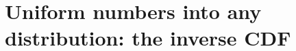 \providecommand{\SixBHoMidCen}{}\renewcommand{\SixBHoMidCen}{0.3184}
\providecommand{\SixBHoRelErrMid}{}\renewcommand{\SixBHoRelErrMid}{0.07862}
\providecommand{\SixBHoRelErrEdge}{}\renewcommand{\SixBHoRelErrEdge}{0.02982}
\providecommand{\SixBKrLoExact}{}\renewcommand{\SixBKrLoExact}{0.4907}
\providecommand{\SixBKrHiExact}{}\renewcommand{\SixBKrHiExact}{0.8639}
\providecommand{\SixBKrModeExact}{}\renewcommand{\SixBKrModeExact}{0.7}
\providecommand{\SixBKrNA}{}\renewcommand{\SixBKrNA}{500}
\providecommand{\SixBKrModeA}{}\renewcommand{\SixBKrModeA}{0.67}
\providecommand{\SixBKrLoA}{}\renewcommand{\SixBKrLoA}{0.4766}
\providecommand{\SixBKrHiA}{}\renewcommand{\SixBKrHiA}{0.8445}
\providecommand{\SixBKrNB}{}\renewcommand{\SixBKrNB}{5000}
\providecommand{\SixBKrModeB}{}\renewcommand{\SixBKrModeB}{0.71}
\providecommand{\SixBKrLoB}{}\renewcommand{\SixBKrLoB}{0.4882}
\providecommand{\SixBKrHiB}{}\renewcommand{\SixBKrHiB}{0.8656}
\providecommand{\SixBKrNC}{}\renewcommand{\SixBKrNC}{50000}
\providecommand{\SixBKrModeC}{}\renewcommand{\SixBKrModeC}{0.71}
\providecommand{\SixBKrLoC}{}\renewcommand{\SixBKrLoC}{0.4907}
\providecommand{\SixBKrHiC}{}\renewcommand{\SixBKrHiC}{0.8637}
\providecommand{\SixBVrI}{}\renewcommand{\SixBVrI}{1.718}
\providecommand{\SixBVrVarPlain}{}\renewcommand{\SixBVrVarPlain}{0.242}
\providecommand{\SixBVrCovAnti}{}\renewcommand{\SixBVrCovAnti}{-0.2342}
\providecommand{\SixBVrVarAntiPair}{}\renewcommand{\SixBVrVarAntiPair}{0.003912}
\providecommand{\SixBVrVarAntiPerEval}{}\renewcommand{\SixBVrVarAntiPerEval}{0.007825}
\providecommand{\SixBVrVarCtrl}{}\renewcommand{\SixBVrVarCtrl}{0.00394}
\providecommand{\SixBVrBeta}{}\renewcommand{\SixBVrBeta}{1.69}
\providecommand{\SixBVrN}{}\renewcommand{\SixBVrN}{1024}
\providecommand{\SixBVrR}{}\renewcommand{\SixBVrR}{4000}
\providecommand{\SixBVrSdPlain}{}\renewcommand{\SixBVrSdPlain}{0.01516}
\providecommand{\SixBVrGainPlain}{}\renewcommand{\SixBVrGainPlain}{1}
\providecommand{\SixBVrSdAnti}{}\renewcommand{\SixBVrSdAnti}{0.002795}
\providecommand{\SixBVrGainAnti}{}\renewcommand{\SixBVrGainAnti}{29.41}
\providecommand{\SixBVrSdCtrl}{}\renewcommand{\SixBVrSdCtrl}{0.001962}
\providecommand{\SixBVrGainCtrl}{}\renewcommand{\SixBVrGainCtrl}{59.7}
\providecommand{\SixBVrSdStrat}{}\renewcommand{\SixBVrSdStrat}{1.556\times10^{-5}}
\providecommand{\SixBVrGainStrat}{}\renewcommand{\SixBVrGainStrat}{9.486\times10^{5}}
\providecommand{\SixBVrStratSlope}{}\renewcommand{\SixBVrStratSlope}{-1.504}
\section{Uniform numbers into any distribution: the inverse CDF}
\label{6b:sec:inverse}


